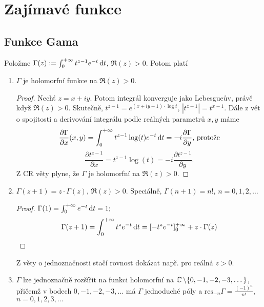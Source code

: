 
\section{Zajímavé funkce}
\subsection{Funkce Gama}
Položme $\Gamma (z) := \int_0^{+\infty}t^{z-1}e^{-t} \mathop{}\!\mathrm{d} t$, $\Re(z)>0$. Potom platí

\begin{enumerate}
    \item $\Gamma$ je holomorfní funkce na $\Re(z)>0$.
     \begin{proof}
      Nechť $z=x+iy$. Potom integrál konverguje jako Lebesgueův, právě když $\Re(z)>0$. Skutečně, $t^{z-1}=e^{(x+iy-1)\cdot \log t}$, $|t^{z-1}|=t^{x-1}$. Dále z vět o spojitosti a derivování integrálu podle reálných parametrů $x, y$ máme
      $$
       \frac{\partial \Gamma}{\partial x}(x,y)=\int_0^{+\infty}t^{z-1}\log (t) e^{-t} \mathop{}\!\mathrm{d} t=-i \frac{\partial \Gamma}{\partial y}\text{, protože}
      $$
      $$
       \frac{\partial t^{z-1}}{\partial x}=t^{z-1}\log (t)=-i \frac{\partial t^{z-1}}{\partial y}\text{.}
      $$
      Z CR věty plyne, že $\Gamma$ je holomorfní na $\Re(z)>0$.
     \end{proof}
    \item $\Gamma (z+1)=z \cdot \Gamma (z)$, $\Re(z)>0$. Speciálně, $\Gamma(n+1)=n!$, $n=0, 1, 2, \dots$
     \begin{proof}
      $\Gamma (1)=\int_0^{+\infty}e^{-t} \mathop{}\!\mathrm{d} t=1 \text{;}$
      $$
       \Gamma(z+1)=\int_0^{+\infty}t^{z}e^{-t} \mathop{}\!\mathrm{d} t=[-t^ze^{-t}]_0^{+\infty}+z\cdot \Gamma (z)
      $$
     \end{proof}
     \begin{note*}
      Z věty o jednoznačnosti stačí rovnost dokázat např. pro reálná $z>0$.
     \end{note*}
    \item $\Gamma$ lze jednoznačně rozšířit na funkci holomorfní na $\operatorname{\mathbb{C}} \setminus \{0, -1, -2, -3, \dots \}$, přičemž v bodech $0, -1, -2, -3, \dots$ má $\Gamma$ jednoduché póly a $\text{res}_{-n} \Gamma=\frac{(-1)^n}{n!}$, $n=0, 1, 2, 3, \dots$
    

\end{enumerate}
